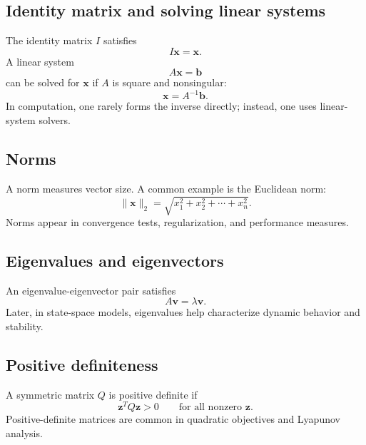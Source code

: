 \documentclass[11pt]{article}
\newcommand{\vect}[1]{\boldsymbol{#1}}
\begin{document}
\subsection{Identity matrix and solving linear systems}

The identity matrix $I$ satisfies
\begin{equation}
I\vect{x}=\vect{x}.
\end{equation}
A linear system
\begin{equation}
A\vect{x}=\vect{b}
\end{equation}
can be solved for $\vect{x}$ if $A$ is square and nonsingular:
\begin{equation}
\vect{x}=A^{-1}\vect{b}.
\end{equation}
In computation, one rarely forms the inverse directly; instead, one uses linear-system solvers.

\subsection{Norms}

A norm measures vector size. A common example is the Euclidean norm:
\begin{equation}
\|\vect{x}\|_2 = \sqrt{x_1^2+x_2^2+\cdots+x_n^2}.
\end{equation}
Norms appear in convergence tests, regularization, and performance measures.

\subsection{Eigenvalues and eigenvectors}

An eigenvalue-eigenvector pair satisfies
\begin{equation}
A\vect{v}=\lambda\vect{v}.
\end{equation}
Later, in state-space models, eigenvalues help characterize dynamic behavior and stability.

\subsection{Positive definiteness}

A symmetric matrix $Q$ is positive definite if
\begin{equation}
\vect{z}^{T}Q\vect{z}>0 \qquad \text{for all nonzero } \vect{z}.
\end{equation}
Positive-definite matrices are common in quadratic objectives and Lyapunov analysis.
\end{document}

